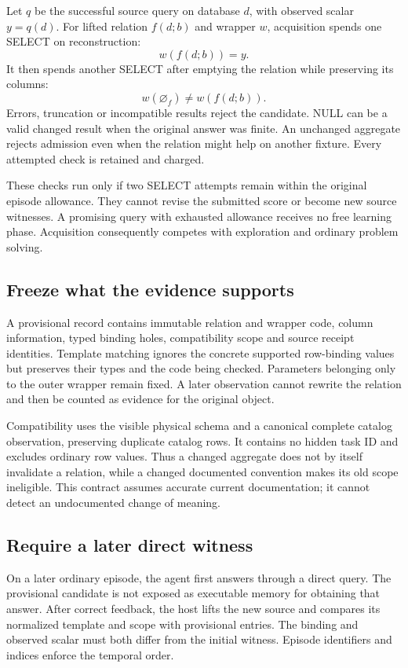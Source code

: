 \documentclass[10pt,twocolumn]{article}
\begin{document}
Let $q$ be the successful source query on database $d$, with observed scalar
$y=q(d)$. For lifted relation $f(d;b)$ and wrapper $w$, acquisition spends one
SELECT on reconstruction:
\begin{equation}\label{eq:reconstruction}w(f(d;b))=y.\end{equation}
It then spends another SELECT after emptying the relation while preserving its
columns:
\begin{equation}\label{eq:dependence}w(\varnothing_f)\ne w(f(d;b)).\end{equation}
Errors, truncation or incompatible results reject the candidate. NULL can be a
valid changed result when the original answer was finite. An unchanged
aggregate rejects admission even when the relation might help on another
fixture. Every attempted check is retained and charged.

These checks run only if two SELECT attempts remain within the original episode
allowance. They cannot revise the submitted score or become new source witnesses.
A promising query with exhausted allowance receives no free learning phase.
Acquisition consequently competes with exploration and ordinary problem
solving.

\subsection{Freeze what the evidence supports}
A provisional record contains immutable relation and wrapper code, column
information, typed binding holes, compatibility scope and source receipt
identities. Template matching ignores the concrete supported row-binding values
but preserves their types and the code being checked. Parameters belonging only
to the outer wrapper remain fixed. A later observation cannot rewrite the
relation and then be counted as evidence for the original object.

Compatibility uses the visible physical schema and a canonical complete catalog
observation, preserving duplicate catalog rows. It contains no hidden task ID
and excludes ordinary row values. Thus a changed aggregate does not by itself
invalidate a relation, while a changed documented convention makes its old
scope ineligible. This contract assumes accurate current documentation; it
cannot detect an undocumented change of meaning.

\subsection{Require a later direct witness}
On a later ordinary episode, the agent first answers through a direct query.
The provisional candidate is not exposed as executable memory for obtaining
that answer. After correct feedback, the host lifts the new source and compares
its normalized template and scope with provisional entries. The binding and
observed scalar must both differ from the initial witness. Episode identifiers
and indices enforce the temporal order.
\end{document}
